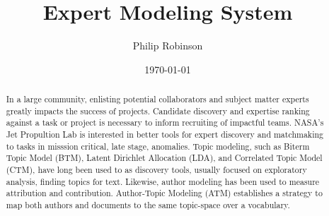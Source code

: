 \documentclass{article}
\title{Expert Modeling System}
\date{\today}
\author{Philip Robinson}
\affil{NASA: Jet Propulsion Laboratory}
\begin{document}
\maketitle

\begin{abstract}
  In a large community, enlisting potential collaborators and subject matter experts
  greatly impacts the success of projects. Candidate discovery and expertise ranking
  against a task or project is necessary to inform recruiting
  of impactful teams\cite{Minto2007}. NASA's Jet Propultion Lab is interested in
  better tools for expert discovery and matchmaking
  to tasks in misssion critical, late stage, anomalies.
  Topic modeling, such as Biterm Topic Model (BTM)\cite{Yan2013,Chen2015}, Latent
  Dirichlet Allocation (LDA),
  and Correlated Topic Model (CTM), have long been used to as discovery tools,
  usually focused on exploratory analysis, finding topics for text\cite{Alghamdi2015}.
  Likewise,
  author modeling has been used to measure attribution\cite{Rexha2018} and
  contribution\cite{AldebeiHJ016}. Author-Topic Modeling (ATM) establishes a strategy to
  map both authors and documents to the same topic-space over a vocabulary\cite{RosenZvi2004}.
\end{abstract}

\end{document}
